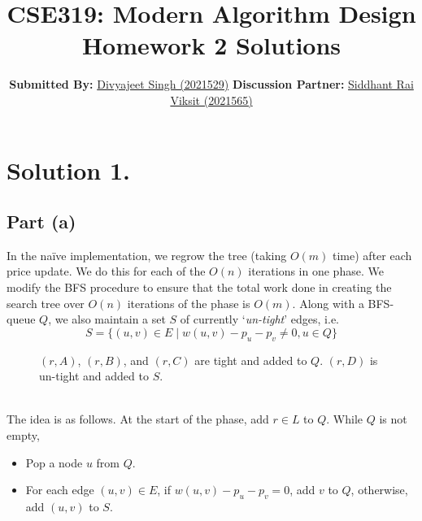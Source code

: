 \documentclass[9pt]{article}
\title{
    \textbf{CSE319: Modern Algorithm Design} \\
    \textbf{\large{Homework 2 Solutions}}
}
\author{
    \textbf{Submitted By:} \href{mailto:divyajeet21529@iiitd.ac.in}{Divyajeet Singh (2021529)}
    \hfill
    \textbf{Discussion Partner:} \href{mailto:siddhant21565@iiitd.ac.in}{Siddhant Rai Viksit (2021565)}
}
\date{}
\begin{document}
\maketitle

\section*{Solution 1.}
\subsection*{Part (a)}
In the naïve implementation, we regrow the tree (taking $O(m)$ time) after each price update.
We do this for each of the $O(n)$ iterations in one phase. We modify the BFS procedure to
ensure that the total work done in creating the search tree over $O(n)$ iterations of the
phase is $O(m)$. Along with a BFS-queue $Q$, we also maintain a set $S$ of currently
`\textit{un-tight}' edges, i.e.
\begin{equation}
    S = \{ (u, v) \in E \mid w(u, v) - p_{u} - p_{v} \neq 0, u \in Q \}
\end{equation}
\begin{figure}[htbp]
    \centering
    \caption{$(r, A)$, $(r, B)$, and $(r, C)$ are tight and added to $Q$. $(r, D)$ is un-tight and added to $S$.}
\end{figure}
\vspace*{0pt} \\
The idea is as follows. At the start of the phase, add $r \in L$ to $Q$. While $Q$ is not empty,
\begin{itemize}
    \item Pop a node $u$ from $Q$.
    \item For each edge $(u, v) \in E$, if $w(u, v) - p_{u} - p_{v} = 0$, add $v$ to $Q$,
    otherwise, add $(u, v)$ to $S$.
\end{itemize}
\end{document}

